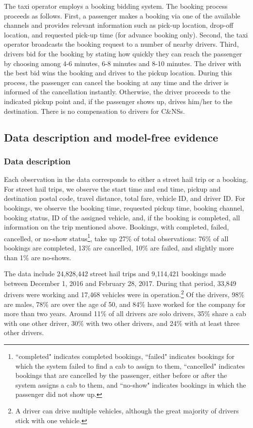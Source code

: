 \documentclass[reviewmode]{restud}
\begin{document}
The taxi operator employs a booking bidding system. The booking process proceeds as follows. First, a passenger makes a booking via one of the available channels and provides relevant information such as pick-up location, drop-off location, and requested pick-up time (for advance booking only). Second, the taxi operator broadcasts the booking request to a number of nearby drivers. Third, drivers bid for the booking by stating how quickly they can reach the passenger by choosing among 4-6 minutes, 6-8 minutes and 8-10 minutes. The driver with the best bid wins the booking and drives to the pickup location. During this process, the passenger can cancel the booking at any time and the driver is informed of the cancellation instantly. Otherwise, the driver proceeds to the indicated pickup point and, if the passenger shows up, drives him/her to the destination. There is no compensation to drivers for C\&NSs.

\subsection{Data description and model-free evidence}

\subsubsection{Data description}
Each observation in the data corresponds to either a street hail trip or a booking. For street hail trips, we observe the start time and end time, pickup and destination postal code, 
travel distance, total fare, vehicle ID, and driver ID. For bookings, we observe the booking time, requested pickup time, booking channel, booking status,  ID of the assigned vehicle, and, if the booking is completed, all information on the trip mentioned above. Bookings, with completed, failed, cancelled, or no-show status\footnote{``completed" indicates completed bookings, ``failed" indicates bookings for which the system failed to find a cab to assign to them, ``cancelled" indicates bookings that are cancelled by the passenger, either before or after the system assigns a cab to them, and ``no-show" indicates bookings in which the passenger did not show up.}, take up 27\% of  total observations: 76\% of all bookings are completed, 13\% are cancelled, 10\% are failed, and slightly more than 1\% are no-shows.

The data include 24,828,442 street hail trips and 9,114,421 bookings made between December 1, 2016 and February 28, 2017. During that period, 33,849 drivers were working and 17,468 vehicles were in operation.\footnote{A 
driver can drive multiple vehicles, although the great majority of drivers stick with one vehicle.} Of the drivers, 98\% are males, 78\% are over the age of 50, and 84\% have worked for the company for more than two years. Around 11\% of all drivers are solo drivers, 35\% share a cab with one other driver, 30\% with two other drivers, and 24\% with at least three other drivers.
\end{document}
